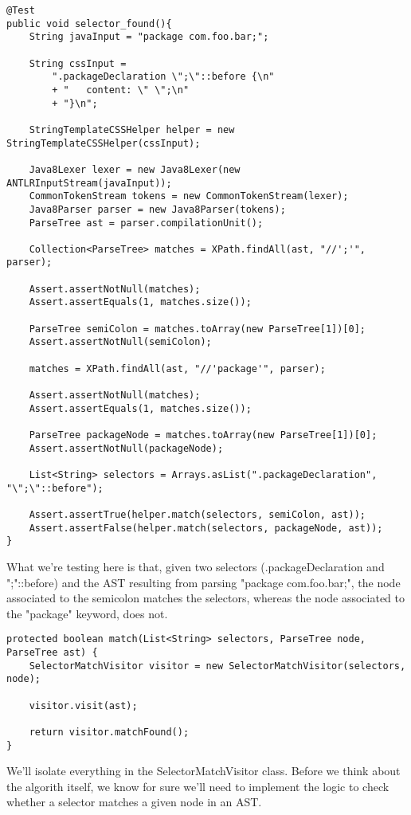 \documentclass[11pt]{article}
\begin{document}
\begin{verbatim}
@Test
public void selector_found(){
    String javaInput = "package com.foo.bar;";

    String cssInput =
        ".packageDeclaration \";\"::before {\n"
        + "   content: \" \";\n"
        + "}\n";

    StringTemplateCSSHelper helper = new StringTemplateCSSHelper(cssInput);

    Java8Lexer lexer = new Java8Lexer(new ANTLRInputStream(javaInput));
    CommonTokenStream tokens = new CommonTokenStream(lexer);
    Java8Parser parser = new Java8Parser(tokens);
    ParseTree ast = parser.compilationUnit();

    Collection<ParseTree> matches = XPath.findAll(ast, "//';'", parser);

    Assert.assertNotNull(matches);
    Assert.assertEquals(1, matches.size());

    ParseTree semiColon = matches.toArray(new ParseTree[1])[0];
    Assert.assertNotNull(semiColon);

    matches = XPath.findAll(ast, "//'package'", parser);

    Assert.assertNotNull(matches);
    Assert.assertEquals(1, matches.size());

    ParseTree packageNode = matches.toArray(new ParseTree[1])[0];
    Assert.assertNotNull(packageNode);

    List<String> selectors = Arrays.asList(".packageDeclaration", "\";\"::before");

    Assert.assertTrue(helper.match(selectors, semiColon, ast));
    Assert.assertFalse(helper.match(selectors, packageNode, ast));
}
\end{verbatim}

What we're testing here is that, given two selectors (.packageDeclaration and ";"::before) and the AST
resulting from parsing "package com.foo.bar;", the node associated to the semicolon matches the selectors, whereas
the node associated to the "package" keyword, does not.

\begin{verbatim}
protected boolean match(List<String> selectors, ParseTree node, ParseTree ast) {
    SelectorMatchVisitor visitor = new SelectorMatchVisitor(selectors, node);

    visitor.visit(ast);

    return visitor.matchFound();
}
\end{verbatim}

We'll isolate everything in the SelectorMatchVisitor class. Before we think about the algorith itself,
we know for sure we'll need to implement the logic to check whether a selector matches a given node
in an AST.
\end{document}
